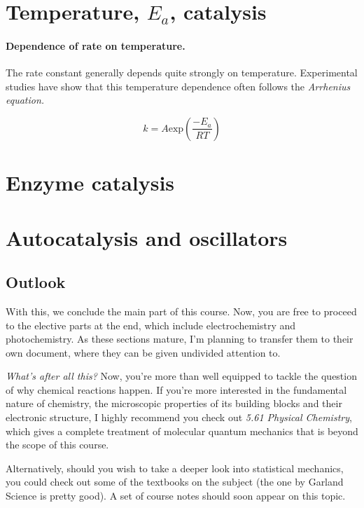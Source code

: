\documentclass{article}
\numberwithin{theorem}{section}
\numberwithin{corollary}{section}
\numberwithin{postulate}{section}
\numberwithin{lemma}{section}
\numberwithin{definition}{section}
\begin{document}
\section{Temperature, $E_a$, catalysis}

\paragraph{Dependence of rate on temperature. }The rate constant generally
depends quite strongly on temperature. Experimental studies have show that this
temperature dependence often follows the \textit{Arrhenius equation.}

\begin{equation}
  k = A \mathrm{exp} \left( \frac{- E_a}{RT} \right)
\end{equation}

\section{Enzyme catalysis}

\section{Autocatalysis and oscillators}

\subsection{Outlook}

With this, we conclude the main part of this course. Now, you are free to
proceed to the elective parts at the end, which include electrochemistry and
photochemistry. As these sections mature, I'm planning to transfer them to their
own document, where they can be given undivided attention to.

\textit{What's after all this?} Now, you're more than well equipped to tackle
the question of why chemical reactions happen. If you're more interested in the
fundamental nature of chemistry, the microscopic properties of its building
blocks and their electronic structure, I highly recommend you check out
\textit{5.61 Physical Chemistry}, which gives a complete treatment of molecular
quantum mechanics that is beyond the scope of this course.

Alternatively, should you wish to take a deeper look into statistical mechanics,
you could check out some of the textbooks on the subject (the one by Garland
Science is pretty good). A set of course notes should soon appear on this topic.
\end{document}
